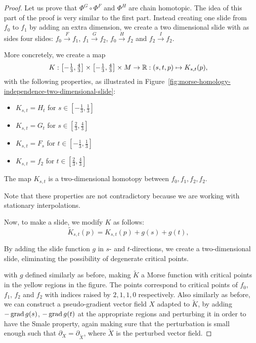 \begin{proof}
Let us prove that $\Phi^{G}  \circ  \Phi^{F}$ and $\Phi^{H}$ are chain homotopic.
The idea of this part of the proof is very similar to the first part.
Instead creating one slide from $f_0$ to $f_1$ by adding an extra dimension, we create a two dimensional slide with as sides four slides: $f_0 \xrightarrow{F} f_1$, $ f_1 \xrightarrow{G} f_2$, $f_0 \xrightarrow{H}  f_2$ and $ f_2 \xrightarrow{I} f_2$.


More concretely, we create a map
\[
    K: \left[-\tfrac{1}{3}, \tfrac{4}{3}\right] \times \left[-\tfrac{1}{3}, \tfrac{4}{3}\right] \times M \to  \mathbb{R}:  (s, t, p) \mapsto K_{s, t}(p)
,\] 
with the following properties, as illustrated in Figure~\ref{fig:morse-homology-independence-two-dimensional-slide}:
\begin{itemize}
    \item $K_{s,t} = H_t$ for  $s \in \left[-\tfrac{1}{3}, \tfrac{1}{3}\right]$
    \item $K_{s,t} = G_t$ for  $s \in \left[\tfrac{2}{3}, \tfrac{4}{3}\right]$
        \item $K_{s, t} = F_s$ for $t \in \left[-\tfrac{1}{3}, \tfrac{1}{3}\right]$ 
        \item $K_{s,t} = f_2$ for $t \in \left[\tfrac{2}{3}, \tfrac{4}{3}\right]$
\end{itemize}
\begin{marginfigure}
    \centering
    \caption{The map $K_{s,t}$ is a two-dimensional homotopy between $f_0, f_1, f_2, f_2$.}
    \label{fig:morse-homology-independence-two-dimensional-slide}
\end{marginfigure}
Note that these properties are not contradictory because we are working with stationary interpolations.

Now, to make a slide, we modify $K$ as follows:
 \[
     \tilde{K}_{s,t}(p) = K_{s,t}(p) + g(s) + g(t)
,\] 

\begin{marginfigure}
    \centering
    \caption{By adding the slide function $g$ in $s$- and $t$-directions, we create a two-dimensional slide, eliminating the possibility of degenerate critical points.}
    \label{fig:morse-homology-independence-two-dimensional-slide-three-d}
\end{marginfigure}

with $g$ defined similarly as before, making $\tilde{K}$ a Morse function with critical points in the yellow regions in the figure.
The points correspond to critical points of $f_0$, $f_1$, $f_2$ and $f_2$ with indices raised by $2, 1, 1, 0$ respectively.
Also similarly as before, we can construct a pseudo-gradient vector field $X$ adapted to $\tilde{K}$, by adding $-\operatorname{grad} g(s)$, $-\operatorname{grad} g(t)$ at the appropriate regions and perturbing it in order to have the Smale property, again making sure that the perturbation is small enough such that $\partial_X = \partial_{\tilde X}$, where $\tilde{X}$ is the perturbed vector field.


\end{proof}

